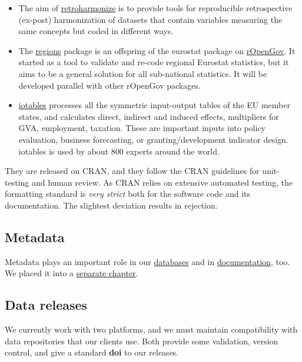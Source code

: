 \documentclass[
  fontsize=13pt,
  english,
  a4paper,
  openany, a4paper, oneside]{article}
\providecommand{\tightlist}{%
  \setlength{\itemsep}{0pt}\setlength{\parskip}{0pt}}
\begin{document}
\begin{itemize}
\tightlist
\item
  The aim of \href{https://reprex.nl/software/retroharmonize/}{retroharmonize} is to provide tools for reproducible retrospective (ex-post) harmonization of datasets that contain variables measuring the same concepts but coded in different ways.
\item
  The \href{https://reprex.nl/software/regions/}{regions} package is an offspring of the eurostat package on \href{https://github.com/rOpenGov}{rOpenGov}. It started as a tool to validate and re-code regional Eurostat statistics, but it aims to be a general solution for all sub-national statistics. It will be developed parallel with other rOpenGov packages.
\item
  \href{https://reprex.nl/software/iotables/}{iotables} processes all the symmetric input-output tables of the EU member states, and calculates direct, indirect and induced effects, multipliers for GVA, employment, taxation. These are important inputs into policy evaluation, business forecasting, or granting/development indicator design. iotables is used by about 800 experts around the world.
\end{itemize}

They are released on CRAN, and they follow the CRAN guidelines for unit-testing and human review. As CRAN relies on extensive automated testing, the formatting standard is \emph{very strict} both for the software code and its documentation. The slightest deviation results in rejection.

\hypertarget{documentation-metadata}{%
\subsection{Metadata}\label{documentation-metadata}}

Metadata plays an important role in our \protect\hyperlink{data-storage}{databases} and in \protect\hyperlink{documentation}{documentation}, too. We placed it into a \protect\hyperlink{metadata}{separate chapter}.

\hypertarget{data-release}{%
\subsection{Data releases}\label{data-release}}

We currently work with two platforms, and we must maintain compatibility with data repositories that our clients use. Both provide some validation, version control, and give a standard \textbf{doi} to our releases.
\end{document}
